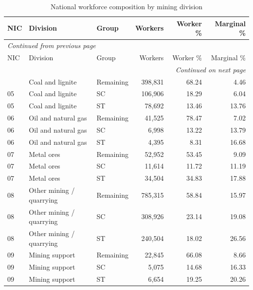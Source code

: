\documentclass[11pt,a4paper]{report}
\begin{document}
\begin{longtable}{l>{\raggedright\arraybackslash}p{4.5cm}lrrr}
\caption{National workforce composition by mining division}\\\toprule
NIC & Division & Group & Workers & Worker \% & Marginal \% \\\midrule\endfirsthead
\multicolumn{6}{l}{\textit{Continued from previous page}}\\\toprule
NIC & Division & Group & Workers & Worker \% & Marginal \% \\\midrule\endhead
\midrule\multicolumn{6}{r}{\textit{Continued on next page}}\\\endfoot\bottomrule\endlastfoot
05 & Coal and lignite & Remaining & 398,831 & 68.24 & 4.46 \\
05 & Coal and lignite & SC & 106,906 & 18.29 & 6.04 \\
05 & Coal and lignite & ST & 78,692 & 13.46 & 13.76 \\
06 & Oil and natural gas & Remaining & 41,525 & 78.47 & 7.02 \\
06 & Oil and natural gas & SC & 6,998 & 13.22 & 13.79 \\
06 & Oil and natural gas & ST & 4,395 & 8.31 & 16.68 \\
07 & Metal ores & Remaining & 52,952 & 53.45 & 9.09 \\
07 & Metal ores & SC & 11,614 & 11.72 & 11.19 \\
07 & Metal ores & ST & 34,504 & 34.83 & 17.88 \\
08 & Other mining /\allowbreak{} quarrying & Remaining & 785,315 & 58.84 & 15.97 \\
08 & Other mining /\allowbreak{} quarrying & SC & 308,926 & 23.14 & 19.08 \\
08 & Other mining /\allowbreak{} quarrying & ST & 240,504 & 18.02 & 26.56 \\
09 & Mining support & Remaining & 22,845 & 66.08 & 8.66 \\
09 & Mining support & SC & 5,075 & 14.68 & 16.33 \\
09 & Mining support & ST & 6,654 & 19.25 & 20.26 \\
\end{longtable}\endgroup
\begingroup\footnotesize\setlength{\tabcolsep}{4pt}
\end{document}
